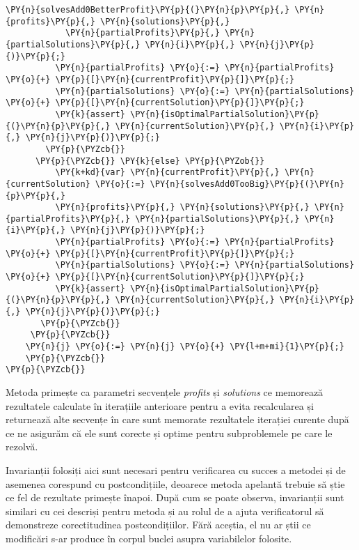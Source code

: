 \begin{sloppypar}
\begin{Verbatim}[commandchars=\\\{\}]
            \PY{n}{solvesAdd0BetterProfit}\PY{p}{(}\PY{n}{p}\PY{p}{,} \PY{n}{profits}\PY{p}{,} \PY{n}{solutions}\PY{p}{,} 
            \PY{n}{partialProfits}\PY{p}{,} \PY{n}{partialSolutions}\PY{p}{,} \PY{n}{i}\PY{p}{,} \PY{n}{j}\PY{p}{)}\PY{p}{;}
          \PY{n}{partialProfits} \PY{o}{:=} \PY{n}{partialProfits} \PY{o}{+} \PY{p}{[}\PY{n}{currentProfit}\PY{p}{]}\PY{p}{;}
          \PY{n}{partialSolutions} \PY{o}{:=} \PY{n}{partialSolutions} \PY{o}{+} \PY{p}{[}\PY{n}{currentSolution}\PY{p}{]}\PY{p}{;}
          \PY{k}{assert} \PY{n}{isOptimalPartialSolution}\PY{p}{(}\PY{n}{p}\PY{p}{,} \PY{n}{currentSolution}\PY{p}{,} \PY{n}{i}\PY{p}{,} \PY{n}{j}\PY{p}{)}\PY{p}{;}
        \PY{p}{\PYZcb{}}
      \PY{p}{\PYZcb{}} \PY{k}{else} \PY{p}{\PYZob{}}
          \PY{k+kd}{var} \PY{n}{currentProfit}\PY{p}{,} \PY{n}{currentSolution} \PY{o}{:=} \PY{n}{solvesAdd0TooBig}\PY{p}{(}\PY{n}{p}\PY{p}{,} 
          \PY{n}{profits}\PY{p}{,} \PY{n}{solutions}\PY{p}{,} \PY{n}{partialProfits}\PY{p}{,} \PY{n}{partialSolutions}\PY{p}{,} \PY{n}{i}\PY{p}{,} \PY{n}{j}\PY{p}{)}\PY{p}{;}
          \PY{n}{partialProfits} \PY{o}{:=} \PY{n}{partialProfits} \PY{o}{+} \PY{p}{[}\PY{n}{currentProfit}\PY{p}{]}\PY{p}{;}
          \PY{n}{partialSolutions} \PY{o}{:=} \PY{n}{partialSolutions} \PY{o}{+} \PY{p}{[}\PY{n}{currentSolution}\PY{p}{]}\PY{p}{;}
          \PY{k}{assert} \PY{n}{isOptimalPartialSolution}\PY{p}{(}\PY{n}{p}\PY{p}{,} \PY{n}{currentSolution}\PY{p}{,} \PY{n}{i}\PY{p}{,} \PY{n}{j}\PY{p}{)}\PY{p}{;}
       \PY{p}{\PYZcb{}}
     \PY{p}{\PYZcb{}}
    \PY{n}{j} \PY{o}{:=} \PY{n}{j} \PY{o}{+} \PY{l+m+mi}{1}\PY{p}{;}
    \PY{p}{\PYZcb{}}
\PY{p}{\PYZcb{}}
\end{Verbatim} 
    \par Metoda primește ca parametri secvențele \textit{profits} și \textit{solutions} ce memorează rezultatele calculate în iterațiile anterioare pentru a evita recalcularea și returnează alte secvențe în care sunt memorate rezultatele iterației curente după ce ne asigurăm că ele sunt corecte și optime pentru subproblemele pe care le rezolvă. \par
    Invarianții folosiți aici sunt necesari pentru verificarea cu succes a metodei și de asemenea corespund cu postcondițiile, deoarece metoda apelantă  trebuie să știe ce fel de rezultate primește înapoi. După cum se poate observa, invarianții sunt similari cu cei descriși pentru metoda  și au rolul de a ajuta verificatorul să demonstreze corectitudinea postcondițiilor. Fără aceștia, el nu ar știi ce modificări s-ar produce în corpul buclei asupra variabilelor folosite. \par

\end{sloppypar}
